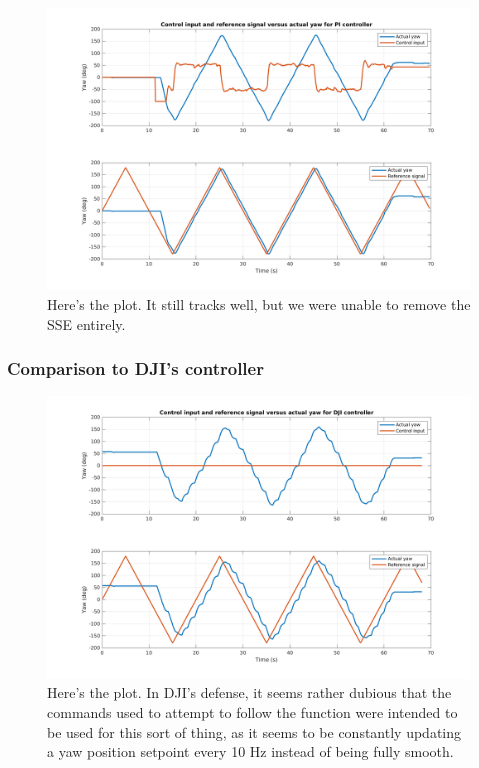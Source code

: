 \documentclass[11pt]{article}
\begin{document}
\begin{figure}[ht]
    \centering 
    \centerline{\includegraphics[scale=0.7]{q531.png}}
    \caption{Here's the plot. It still tracks well, but we were unable to remove the SSE entirely. }
\end{figure}

\newpage \clearpage

\subsubsection{Comparison to DJI's controller}
\begin{figure}[ht]
    \centering 
    \centerline{\includegraphics[scale=0.65]{q532.png}}
    \caption{Here's the plot. In DJI's defense, it seems rather dubious that the commands used to 
    attempt to follow the function were intended to be used for this sort of thing, as it seems to 
    be constantly updating a yaw position setpoint every 10 Hz instead of being fully smooth.}
\end{figure}
\end{document}
